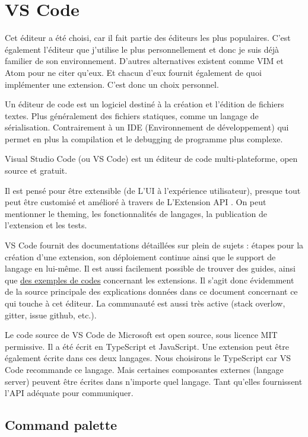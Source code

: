 \documentclass[
    iict, %
    il, %
]{heig-tb}
\begin{document}
\section{VS Code}
Cet éditeur a été choisi, car il fait partie des éditeurs les plus populaires. C'est également l'éditeur que j'utilise le plus personnellement et donc je suis déjà familier de son environnement.
D'autres alternatives existent comme VIM et Atom pour ne citer qu'eux. Et chacun d'eux fournit également de quoi implémenter une extension.
C'est donc un choix personnel.

Un éditeur de code est un logiciel destiné à la création et l'édition de fichiers textes. Plus généralement des fichiers statiques, comme un langage de sérialisation. Contrairement à un IDE (Environnement de développement) qui permet en plus la compilation et le debugging de programme plus complexe.

Visual Studio Code (ou VS Code) est un éditeur de code multi-plateforme, open source et gratuit.

Il est pensé pour être extensible (de L'UI à l'expérience utilisateur), presque tout peut être customisé et amélioré à travers de L'Extension API \cite{extension-api}.
On peut mentionner le theming, les fonctionnalités de langages, la publication de l'extension et les tests.

VS Code fournit des documentations détaillées sur plein de sujets : étapes pour la création d'une extension, son déploiement continue ainsi que le support de langage en lui-même.
Il est aussi facilement possible de trouver des guides, ainsi que \href{https://github.com/microsoft/vscode-extension-samples}{des exemples de codes} concernant les extensions.
Il s'agit donc évidemment de la source principale des explications données dans ce document concernant ce qui touche à cet éditeur.
La communauté est aussi très active (stack overlow, gitter, issue github, etc.).

Le code source de VS Code de Microsoft est open source, sous licence MIT permissive.
Il a été écrit en TypeScript et JavaScript. Une extension peut être également écrite dans ces deux langages.
Nous choisirons le TypeScript car VS Code recommande ce langage. Mais certaines composantes externes (langage server) peuvent être écrites dans n'importe quel langage. Tant qu'elles fournissent l'API adéquate pour communiquer.

\subsection{Command palette}\label{command-palette}
\end{document}
